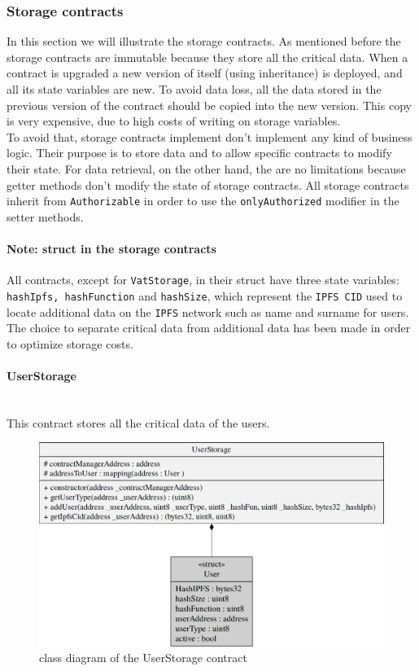 \hypertarget{st}{\subsubsection{Storage contracts}}
In this section we will illustrate the storage contracts. As mentioned before the storage contracts are immutable because they store all the critical data. When a contract is upgraded a new version of itself (using inheritance) is deployed, and all its state variables are new. To avoid data loss, all the data stored in the previous version of the contract should be copied into the new version. This copy is very expensive, due to high costs of writing on storage variables.\\
To avoid that, storage contracts implement don't implement any kind of business logic. Their purpose is to store data and to allow specific contracts to modify their state. For data retrieval, on the other hand, the are no limitations because getter methods don't modify the state of storage contracts.
All storage contracts inherit from \texttt{Authorizable} in order to use the \texttt{onlyAuthorized} modifier in the setter methods.
\paragraph*{Note: struct in the storage contracts}
All contracts, except for \texttt{VatStorage}, in their struct have three state variables: \texttt{hashIpfs, hashFunction} and \texttt{hashSize}, which represent the \texttt{IPFS CID} used to locate additional data on the \texttt{IPFS} network such as name and surname for users. The choice to separate critical data from additional data has been made in order to optimize storage costs.
\pagebreak
\paragraph{UserStorage}\mbox{}\\

\noindent This contract stores all the critical data of the users. 
\begin{figure}[H]
	\centering
	\includegraphics[scale=0.25]{res/images/solidity/userstorage.png}
	\caption{class diagram of the UserStorage contract}
\end{figure}
\pagebreak
